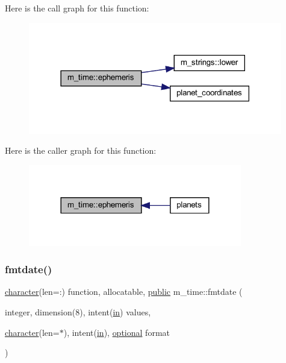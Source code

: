 Here is the call graph for this function\+:
\nopagebreak
\begin{figure}[H]
\begin{center}
\leavevmode
\includegraphics[width=314pt]{namespacem__time_a915b29d3b8abeeb7455eb5d6eed28790_cgraph}
\end{center}
\end{figure}
Here is the caller graph for this function\+:
\nopagebreak
\begin{figure}[H]
\begin{center}
\leavevmode
\includegraphics[width=264pt]{namespacem__time_a915b29d3b8abeeb7455eb5d6eed28790_icgraph}
\end{center}
\end{figure}
\mbox{\label{namespacem__time_a2cb84c9b8af4f395b76aed76e1431328}} 
\subsubsection{\texorpdfstring{fmtdate()}{fmtdate()}}
{\footnotesize\ttfamily \hyperlink{option__stopwatch_83_8txt_abd4b21fbbd175834027b5224bfe97e66}{character}(len=\+:) function, allocatable, \hyperlink{M__stopwatch_83_8txt_a2f74811300c361e53b430611a7d1769f}{public} m\+\_\+time\+::fmtdate (\begin{DoxyParamCaption}\item[{integer, dimension(8), intent(\hyperlink{M__journal_83_8txt_afce72651d1eed785a2132bee863b2f38}{in})}]{values,  }\item[{\hyperlink{option__stopwatch_83_8txt_abd4b21fbbd175834027b5224bfe97e66}{character}(len=$\ast$), intent(\hyperlink{M__journal_83_8txt_afce72651d1eed785a2132bee863b2f38}{in}), \hyperlink{option__stopwatch_83_8txt_aa4ece75e7acf58a4843f70fe18c3ade5}{optional}}]{format }\end{DoxyParamCaption})}



